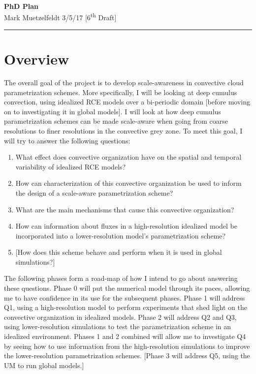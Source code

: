 \documentclass[11pt,a4paper]{article}
\newcommand{\ts}{\textsuperscript}
\begin{document}
\begin{center}
    \Large{\textbf{PhD Plan}}\\[0.15cm]
    \large{Mark Muetzelfeldt 3/5/17 [6\ts{th} Draft]}\\ 
    \rule{\textwidth}{0.2mm}
\end{center}

\section*{Overview}

The overall goal of the project is to develop scale-awareness in convective cloud parametrization schemes. More specifically, I will be looking at deep cumulus convection, using idealized RCE models over a bi-periodic domain [before moving on to investigating it in global models]. I will look at how deep cumulus parametrization schemes can be made scale-aware when going from coarse resolutions to finer resolutions in the convective grey zone. To meet this goal, I will try to answer the following questions:

\begin{enumerate}
    \item What effect does convective organization have on the spatial and temporal variability of idealized RCE models?
    \item How can characterization of this convective organization be used to inform the design of a scale-aware parametrization scheme?
    \item What are the main mechanisms that cause this convective organization?
    \item How can information about fluxes in a high-resolution idealized model be incorporated into a lower-resolution model's parametrization scheme?
    \item  {[How does this scheme behave and perform when it is used in global simulations?]}
\end{enumerate}

The following phases form a road-map of how I intend to go about answering these questions. Phase 0 will put the numerical model through its paces, allowing me to have confidence in its use for the subsequent phases. Phase 1 will address Q1, using a high-resolution model to perform experiments that shed light on the convective organization in idealized models. Phase 2 will address Q2 and Q3, using lower-resolution simulations to test the parametrization scheme in an idealized environment. Phases 1 and 2 combined will allow me to investigate Q4 by seeing how to use information from the high-resolution simulations to improve the lower-resolution parametrization schemes. [Phase 3 will address Q5, using the UM to run global models.]
\end{document}
